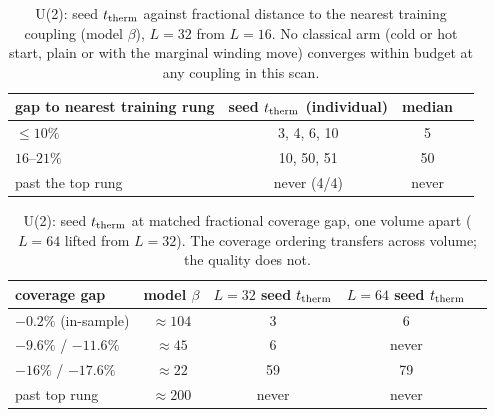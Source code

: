 \begin{table}[htbp]
\centering
\caption{U(2): seed $t_{\rm therm}$ against fractional distance to the
nearest training coupling (model $\beta$), $L=32$ from $L=16$. No
classical arm (cold or hot start, plain or with the marginal winding
move) converges within budget at any coupling in this scan.}
\label{tab:u2_coverage}
\begin{tabular}{lccc}
\toprule
gap to nearest training rung & seed $t_{\rm therm}$ (individual) & median \\
\midrule
$\le 10\%$        & 3, 4, 6, 10  & 5 \\
$16$--$21\%$      & 10, 50, 51   & 50 \\
past the top rung & never (4/4) & never \\
\bottomrule
\end{tabular}
\end{table}

\begin{table}[htbp]
\centering
\caption{U(2): seed $t_{\rm therm}$ at matched fractional coverage gap,
one volume apart ($L=64$ lifted from $L=32$). The coverage ordering
transfers across volume; the quality does not.}
\label{tab:u2_volume}
\begin{tabular}{lcccc}
\toprule
coverage gap & model $\beta$ & $L=32$ seed $t_{\rm therm}$ & $L=64$ seed $t_{\rm therm}$ \\
\midrule
$-0.2\%$ (in-sample) & $\approx 104$ & 3 & 6 \\
$-9.6\%$ / $-11.6\%$ & $\approx 45$  & 6 & never \\
$-16\%$ / $-17.6\%$  & $\approx 22$  & 59 & 79 \\
past top rung        & $\approx 200$ & never & never \\
\bottomrule
\end{tabular}
\end{table}

